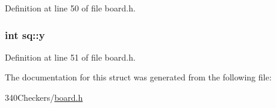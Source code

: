Definition at line 50 of file board.\-h.

\hypertarget{structsq_a1b0e5a26db37d818cb634406f2314293}{
\subsubsection[{y}]{\setlength{\rightskip}{0pt plus 5cm}int sq\-::y}}\label{structsq_a1b0e5a26db37d818cb634406f2314293}


Definition at line 51 of file board.\-h.



The documentation for this struct was generated from the following file\-:\begin{DoxyCompactItemize}
\item 
340\-Checkers/\hyperlink{board_8h}{board.\-h}\end{DoxyCompactItemize}
